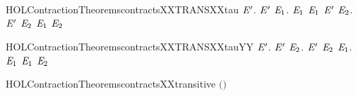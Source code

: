 \begin{SaveVerbatim}{HOLContractionTheoremscontractsXXTRANSXXtau}
\HOLTokenTurnstile{} \HOLSymConst{\HOLTokenForall{}} \ensuremath{\HOLBoundVar{E}\sp{\prime}}.
         \ensuremath{\HOLBoundVar{E}\sp{\prime}} \HOLSymConst{\HOLTokenImp{}}
       \HOLSymConst{\HOLTokenForall{}}\ensuremath{\HOLBoundVar{E}\sb{\mathrm{1}}}.
            \HOLTokenTransBegin\HOLConst{\ensuremath{\tau}}\HOLTokenTransEnd \ensuremath{\HOLBoundVar{E}\sb{\mathrm{1}}} \HOLSymConst{\HOLTokenImp{}}
           \ensuremath{\HOLBoundVar{E}\sb{\mathrm{1}}}  \ensuremath{\HOLBoundVar{E}\sp{\prime}} \HOLSymConst{\HOLTokenDisj{}} \HOLSymConst{\HOLTokenExists{}}\ensuremath{\HOLBoundVar{E}\sb{\mathrm{2}}}. \ensuremath{\HOLBoundVar{E}\sp{\prime}} \HOLTokenTransBegin\HOLConst{\ensuremath{\tau}}\HOLTokenTransEnd \ensuremath{\HOLBoundVar{E}\sb{\mathrm{2}}} \HOLSymConst{\HOLTokenConj{}} \ensuremath{\HOLBoundVar{E}\sb{\mathrm{1}}}  \ensuremath{\HOLBoundVar{E}\sb{\mathrm{2}}}
\end{SaveVerbatim}
\newcommand{\HOLContractionTheoremscontractsXXTRANSXXtau}{\UseVerbatim{HOLContractionTheoremscontractsXXTRANSXXtau}}
\begin{SaveVerbatim}{HOLContractionTheoremscontractsXXTRANSXXtauYY}
\HOLTokenTurnstile{} \HOLSymConst{\HOLTokenForall{}} \ensuremath{\HOLBoundVar{E}\sp{\prime}}.
         \ensuremath{\HOLBoundVar{E}\sp{\prime}} \HOLSymConst{\HOLTokenImp{}}
       \HOLSymConst{\HOLTokenForall{}}\ensuremath{\HOLBoundVar{E}\sb{\mathrm{2}}}. \ensuremath{\HOLBoundVar{E}\sp{\prime}} \HOLTokenTransBegin\HOLConst{\ensuremath{\tau}}\HOLTokenTransEnd \ensuremath{\HOLBoundVar{E}\sb{\mathrm{2}}} \HOLSymConst{\HOLTokenImp{}} \HOLSymConst{\HOLTokenExists{}}\ensuremath{\HOLBoundVar{E}\sb{\mathrm{1}}}.   \ensuremath{\HOLBoundVar{E}\sb{\mathrm{1}}} \HOLSymConst{\HOLTokenConj{}}  \ensuremath{\HOLBoundVar{E}\sb{\mathrm{1}}} \ensuremath{\HOLBoundVar{E}\sb{\mathrm{2}}}
\end{SaveVerbatim}
\newcommand{\HOLContractionTheoremscontractsXXTRANSXXtauYY}{\UseVerbatim{HOLContractionTheoremscontractsXXTRANSXXtauYY}}
\begin{SaveVerbatim}{HOLContractionTheoremscontractsXXtransitive}
\HOLTokenTurnstile{}  \ensuremath{(}\ensuremath{)}
\end{SaveVerbatim}
\newcommand{\HOLContractionTheoremscontractsXXtransitive}{\UseVerbatim{HOLContractionTheoremscontractsXXtransitive}}
